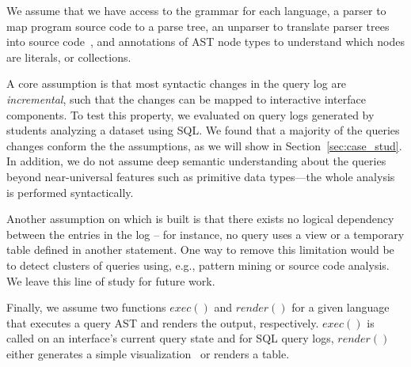 

 We assume that we have access to the grammar for each language, a parser to map program source code to a parse tree, an unparser to translate parser trees into source code~\cite{unparse}, and annotations of AST node types to understand which nodes are literals, or collections.

A core assumption is that most syntactic changes in the query log are {\it incremental}, such that the changes can be mapped to interactive interface components. To test this property, we evaluated \sys on query logs generated by students analyzing a dataset using SQL. We found that a majority of the queries changes conform the the assumptions, as we will show in Section~\ref{sec:case_stud}. In addition, we do not assume deep semantic understanding about the queries beyond near-universal features such as primitive data types---the whole analysis is performed syntactically.

Another assumption on which \sys{} is built is that there exists no logical dependency between the entries in the log -- for instance, no query uses a view or a temporary table defined in another statement. One way to remove this limitation would be to detect clusters of queries using, e.g., pattern mining or source code analysis. We leave this line of study for future work.

Finally, we assume two functions $exec()$ and $render()$ for a given language that executes a query AST and renders the output, respectively.  $exec()$ is called on an interface's current query state and for SQL query logs, $render()$ either generates a simple visualization~\cite{mackinlay2007show,mackinlay1986automating} or renders a table.






